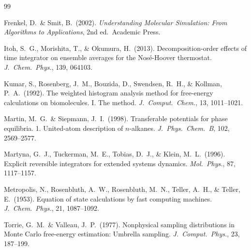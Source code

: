 \documentclass[12pt,a4paper]{article}
\begin{document}

\begin{thebibliography}{99}

Frenkel, D.\ \& Smit, B.\ (2002).
\emph{Understanding Molecular Simulation: From Algorithms to Applications},
2nd ed.\ Academic Press.

Itoh, S.\ G., Morishita, T., \& Okumura, H.\ (2013).
Decomposition-order effects of time integrator on ensemble averages for the
Nos\'{e}-Hoover thermostat.
\emph{J.\ Chem.\ Phys.}, 139, 064103.

Kumar, S., Rosenberg, J.\ M., Bouzida, D., Swendsen, R.\ H., \& Kollman, P.\ A.\ (1992).
The weighted histogram analysis method for free-energy calculations on
biomolecules. I. The method.
\emph{J.\ Comput.\ Chem.}, 13, 1011--1021.

Martin, M.\ G.\ \& Siepmann, J.\ I.\ (1998).
Transferable potentials for phase equilibria. 1. United-atom description of
$n$-alkanes.
\emph{J.\ Phys.\ Chem.\ B}, 102, 2569--2577.

Martyna, G.\ J., Tuckerman, M.\ E., Tobias, D.\ J., \& Klein, M.\ L.\ (1996).
Explicit reversible integrators for extended systems dynamics.
\emph{Mol.\ Phys.}, 87, 1117--1157.

Metropolis, N., Rosenbluth, A.\ W., Rosenbluth, M.\ N., Teller, A.\ H., \& Teller, E.\ (1953).
Equation of state calculations by fast computing machines.
\emph{J.\ Chem.\ Phys.}, 21, 1087--1092.

Torrie, G.\ M.\ \& Valleau, J.\ P.\ (1977).
Nonphysical sampling distributions in Monte Carlo free-energy estimation:
Umbrella sampling.
\emph{J.\ Comput.\ Phys.}, 23, 187--199.

\end{thebibliography}
\end{document}
